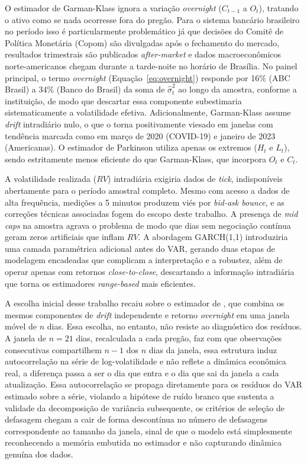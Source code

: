 \documentclass[12pt, a4paper, oneside, english, brazil]{abntex2}
\begin{document}
O estimador de Garman-Klass ignora a variação \textit{overnight} ($C_{t-1}$ a $O_t$),
tratando o ativo como se nada ocorresse fora do pregão. Para o sistema bancário brasileiro
no período isso é particularmente problemático já que decisões do Comitê de Política
Monetária (Copom) são divulgadas após o fechamento do mercado, resultados trimestrais são
publicados \textit{after-market} e dados macroeconômicos norte-americanos chegam durante a
tarde-noite no horário de Brasília. No painel principal, o termo \textit{overnight}
(Equação~\ref{eq:overnight}) responde por 16\% (ABC Brasil) a 34\% (Banco do
Brasil) da soma de $\hat{\sigma}^2_t$ ao longo da amostra, conforme a
instituição, de modo que descartar essa componente subestimaria
sistematicamente a volatilidade efetiva. Adicionalmente, Garman-Klass
assume \textit{drift} intradiário nulo, o que o torna positivamente viesado em janelas com
tendência marcada como em março de 2020 (COVID-19) e janeiro de 2023 (Americanas). O
estimador de Parkinson utiliza apenas os extremos ($H_t$ e $L_t$), sendo estritamente
menos eficiente do que Garman-Klass, que incorpora $O_t$ e $C_t$.

A volatilidade realizada ($RV$) intradiária exigiria dados de \textit{tick},
indisponíveis abertamente para o período amostral completo. Mesmo com acesso a dados de
alta frequência, medições a 5 minutos produzem viés por \textit{bid-ask bounce}, e as
correções técnicas associadas fogem do escopo deste trabalho. A presença de \textit{mid
caps} na amostra agrava o problema de modo que dias sem negociação contínua geram zeros artificiais
que inflam $RV$. A abordagem GARCH(1,1) introduziria uma camada paramétrica adicional
antes do VAR, gerando duas etapas de modelagem encadeadas que complicam a interpretação
e a robustez, além de operar apenas com retornos \textit{close-to-close}, descartando
a informação intradiária que torna os estimadores \textit{range-based} mais eficientes.

A escolha inicial desse trabalho recaiu sobre o estimador de \textcite{yang2000},
que combina os mesmos componentes de \textit{drift} independente e retorno \textit{overnight}
em uma janela móvel de $n$ dias. Essa escolha, no entanto, não resiste ao diagnóstico dos resíduos. 
A janela de $n = 21$ dias, recalculada a cada pregão, faz com que observações consecutivas
compartilhem $n-1$ dos $n$ dias da janela, essa estrutura induz autocorrelação na série de 
log-volatilidade e não reflete a dinâmica econômica real, a diferença passa a ser o dia que entra
e o dia que sai da janela a cada atualização. Essa autocorrelação se propaga
diretamente para os resíduos do VAR estimado sobre a série, violando a
hipótese de ruído branco que sustenta a validade da decomposição de variância
subsequente, os critérios de seleção de defasagem
chegam a cair de forma descontínua no número de defasagens correspondente ao
tamanho da janela, sinal de que o modelo está simplesmente reconhecendo a
memória embutida no estimador e não capturando dinâmica genuína dos dados.
\end{document}
